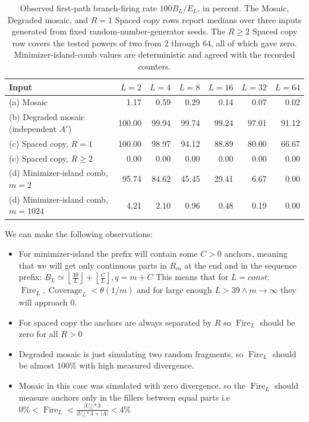 \begin{table}[H]
\centering
\caption{Observed first-path branch-firing rate \(100B_L/E_L\), in percent.
The Mosaic, Degraded mosaic, and \(R=1\) Spaced copy rows report medians over three
inputs generated from fixed random-number-generator seeds.  The \(R\geq2\)
Spaced copy row covers the tested powers of two from 2 through 64, all of
which gave zero.  Minimizer-island-comb values are deterministic and agreed
with the recorded counters.}
\label{tab:chaining-runl-firing}
\scriptsize
\setlength{\tabcolsep}{3.2pt}
\begin{tabular}{lrrrrrr}
\toprule
Input & \(L=2\) & \(L=4\) & \(L=8\) & \(L=16\) & \(L=32\) & \(L=64\) \\
\midrule
(a) Mosaic                     &   1.17 &  0.59 &  0.29 &  0.14 &  0.07 &  0.02 \\
(b) Degraded mosaic (independent \(A'\)) & 100.00 & 99.94 & 99.74 & 99.24 & 97.01 & 91.12 \\
(c) Spaced copy, \(R=1\)       & 100.00 & 98.97 & 94.12 & 88.89 & 80.00 & 66.67 \\
(c) Spaced copy, \(R\geq2\)   &   0.00 &  0.00 &  0.00 &  0.00 &  0.00 &  0.00 \\
(d) Minimizer-island comb, \(m=2\)    & 95.74 & 84.62 & 45.45 & 29.41 & 6.67 & 0.00 \\
(d) Minimizer-island comb, \(m=1024\) &  4.21 &  2.10 &  0.96 &  0.48 & 0.19 & 0.00 \\
\bottomrule
\end{tabular}
\end{table}

We can make the following observations:
\begin{itemize}
  \item For minimizer-island the prefix will contain some $C > 0$ anchors, meaning that we will get only continuous parts in $R_m$ at the end and in the sequence prefix: $B_L \simeq \left\lfloor\frac{39}{L}\right\rfloor + \left\lfloor\frac{C}{L}\right\rfloor, q = m + C$
  This means that for $L = const:$ $\operatorname{Fire}_L, \operatorname{Coverage}_L < \theta(1/m)$ and for large enough $L > 39 \land m \rightarrow \infty$ they will approach $0$.
  \item For spaced copy the anchors are always separated by $R$ so $\operatorname{Fire}_L$ should be zero for all $R > 0$
  \item Degraded mosaic is just simulating two random fragments, so $\operatorname{Fire}_L$ should be almost $100\%$ with high measured divergence.
  \item Mosaic in this case was simulated with zero divergence, so the $\operatorname{Fire}_L$ should measure anchors only in the fillers between equal parts i.e $0\% < \operatorname{Fire}_L < \frac{|U_i|*3}{|U_i|*3+|A|} < 4\%$
\end{itemize}

